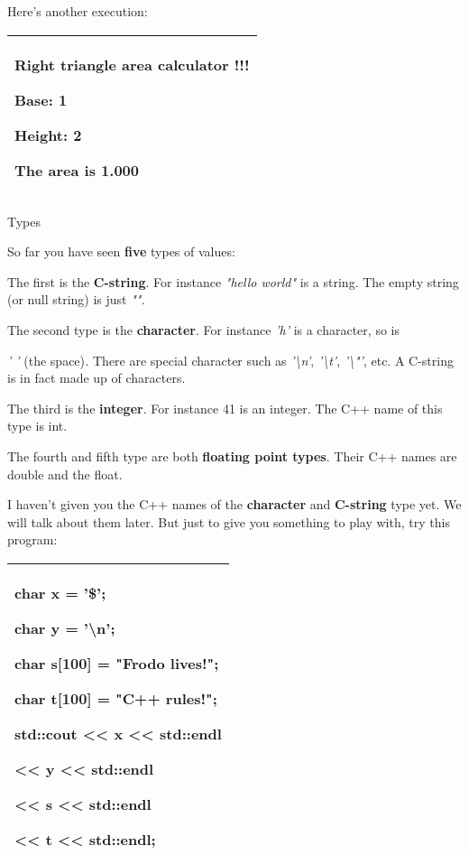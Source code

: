 \documentclass[
]{article}
\begin{document}
Here's another execution:

\begin{longtable}[]{@{}l@{}}
\toprule
\endhead
\begin{minipage}[t]{0.97\columnwidth}\raggedright
Right triangle area calculator !!!

Base: \textbf{1}

Height: \textbf{2}

The area is 1.000\strut
\end{minipage}\tabularnewline
\bottomrule
\end{longtable}

Types

So far you have seen \textbf{five} types of values:

The first is the \textbf{C-string}. For instance \emph{"hello world"} is
a string. The empty string (or null string) is just \emph{"".}

The second type is the \textbf{character}. For instance \emph{'h'} is a
character, so is

\emph{' '} (the space)\emph{. }There are special character such as
\emph{'\textbackslash n'}, \emph{'\textbackslash t'},
\emph{'\textbackslash"'}, etc. A C-string is in fact made up of
characters.

The third is the \textbf{integer}. For instance 41 is an integer. The
C++ name of this type is int.

The fourth and fifth type are both \textbf{floating point types}. Their
C++ names are double and the float.

I haven't given you the C++ names of the \textbf{character} and
\textbf{C-string} type yet. We will talk about them later. But just to
give you something to play with, try this program:

\begin{longtable}[]{@{}l@{}}
\toprule
\endhead
\begin{minipage}[t]{0.97\columnwidth}\raggedright
char x = '\$';

char y = '\textbackslash n';

char s{[}100{]} = "Frodo lives!";

char t{[}100{]} = "C++ rules!";

std::cout \textless\textless{} x \textless\textless{} std::endl

\textless\textless{} y \textless\textless{} std::endl

\textless\textless{} s \textless\textless{} std::endl

\textless\textless{} t \textless\textless{} std::endl;\strut
\end{minipage}\tabularnewline
\bottomrule
\end{longtable}
\end{document}
